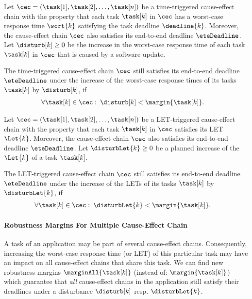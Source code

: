 \begin{tcolorbox}[colback=black!5!white,colframe=black!75!black, breakable, 
title= \textbf{Theorem}: Robustness test for a single time-triggered cause-effect chain]
Let $\cec = (\task[1], \task[2], \ldots, \task[n])$ be a time-triggered cause-effect chain with the property that each task $\task[k]$ in $\cec$ has a worst-case response time $\wcrt{k}$ satisfying the task deadline $\deadline{k}$. 
Moreover, the cause-effect chain $\cec$ also satisfies its end-to-end deadline $\eteDeadline$.
Let $\disturb[k] \geq 0$ be the increase in the worst-case response time of each task $\task[k]$ in $\cec$ that is caused by a software update.
\smallskip

The time-triggered cause-effect chain $\cec$ still satisfies its end-to-end deadline $\eteDeadline$ under the increase of the worst-case response times of its tasks $\task[k]$ by $\disturb[k]$, if  
\begin{align*}
	& \forall \task[k] \in \cec: \:
	\disturb[k] < \margin{\task[k]} .
\end{align*}	
\end{tcolorbox}
\smallskip

\begin{tcolorbox}[colback=black!5!white,colframe=black!75!black, breakable, 
title= \textbf{Theorem}: Robustness test for a single LET-triggered cause-effect chain]
Let $\cec = (\task[1], \task[2], \ldots, \task[n])$ be a LET-triggered cause-effect chain with the property that each task $\task[k]$ in $\cec$ satisfies its LET $\Let{k}$. 
Moreover, the cause-effect chain $\cec$ also satisfies its end-to-end deadline $\eteDeadline$.
Let $\disturbLet{k} \geq 0$ be a planned increase of the $\Let{k}$ of a task $\task[k]$.
\smallskip

The LET-triggered cause-effect chain $\cec$ still satisfies its end-to-end deadline $\eteDeadline$ under the increase of the LETs of its tasks $\task[k]$ by $\disturbLet{k}$, if  
\begin{align*}
	& \forall \task[k] \in \cec: \:
	\disturbLet{k} < \margin{\task[k]}. 
\end{align*}	
\end{tcolorbox}
\bigskip


\paragraph{Robustness Margins For Multiple Cause-Effect Chain}
A task of an application may be part of several cause-effect chains.
Consequently, increasing the worst-case response time (or LET) of this particular task may have an impact on all cause-effect chains that share this task.
We can find new robustness margins $\marginAll{\task[k]}$ (instead of: $\margin{\task[k]}$) which guarantee that \emph{all} cause-effect chains in the application still satisfy their deadlines under a disturbance $\disturb[k]$ resp. $\disturbLet{k}$.
\bigskip

